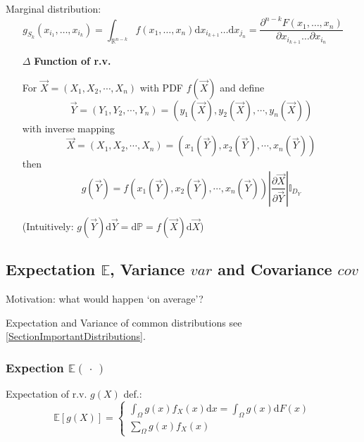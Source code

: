     Marginal distribution: 
    \begin{equation}
        g_{S_k}(x_{i_1},\ldots,x_{i_k})=\int_{\mathbb{R}^{n-k}}f(x_1,\ldots,x_n)\mathrm{d}x_{i_{k+1}}\ldots\mathrm{d}x_{j_n}=\dfrac{\partial^{n-k}F(x_1,\ldots,x_n)}{\partial x_{i_{k+1}}\ldots\partial x_{i_n}}
    \end{equation}


    \begin{itemize}
        \item[$\Delta$] \textbf{Function of r.v.}
        
        For $\vec{X}=(X_1,X_2,\cdots,X_n)$ with PDF $f(\vec{X})$ and define 
        \begin{equation}    
            \vec{Y}=(Y_1,Y_2,\cdots,Y_n)=\left(y_1(\vec{X}),y_2(\vec{X}),\cdots,y_n(\vec{X})\right)
        \end{equation}
        with inverse mapping
        \begin{equation}    
            \vec{X}=(X_1,X_2,\cdots,X_n)=\left(x_1(\vec{Y}),x_2(\vec{Y}),\cdots,x_n(\vec{Y})\right)
        \end{equation}
        then
        \begin{equation}    
            g(\vec{Y})= f\left(x_1(\vec{Y}),x_2(\vec{Y}),\cdots,x_n(\vec{Y})\right)\left|\frac{\partial \vec{X}}{\partial\vec{Y}}\right|\mathbb{I}_{D_Y}
        \end{equation}

        (Intuitively: $g(\vec{Y} )\mathrm{d}\vec{Y}=\mathrm{d}\mathbb{P}=f(\vec{X})\mathrm{d}\vec{X}$)
    \end{itemize}



    




\subsection{Expectation $\mathbb{E}$, Variance $var$ and Covariance $cov$}
Motivation: what would happen `on average'?

Expectation and Variance of common distributions see \autoref{SectionImportantDistributions}.

\subsubsection{Expection $ \mathbb{E}(\,\cdot\,) $}
    Expectation of r.v. $g(X)$ def.:
    \begin{equation}
    \mathbb{E} [g(X)]=\begin{cases}
        {\displaystyle\int_\Omega g(x) f_X(x)\mathrm{d}x=\int_\Omega g(x)\mathrm{d}F(x)}\\
        {\displaystyle\sum_{\Omega}g(x)f_X(x)}
    \end{cases}
\end{equation}

